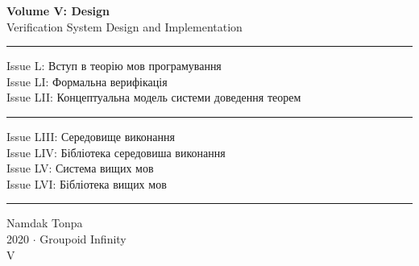 \documentclass{book}
\begin{document}
\begin{titlepage}
    \centering
    \vspace*{0.5in}
    \Huge
    \textbf{Volume V: Design} \\
    \LARGE
    Verification System Design and Implementation \\
    \vspace{1.5in}
    \small
    \flushleft
    \vspace{-2mm} \rule{\textwidth}{0.4pt}
    Issue L: Вступ в теорію мов програмування \\
    Issue LI: Формальна верифікація \\
    Issue LII: Концептуальна модель системи доведення теорем \\
    \vspace{-2mm} \rule{\textwidth}{0.4pt}
    Issue LIII: Середовище виконання \\
    Issue LIV: Бібліотека середовиша виконання \\
    Issue LV: Система вищих мов \\
    Issue LVI: Бібліотека вищих мов \\
    \vspace{-2mm} \rule{\textwidth}{0.4pt}
    \centering
    \vfill
    \large
    Namdak Tonpa \\
    \Large
    2020 $\cdot$ Groupoid Infinity \\
    V
\end{titlepage}

\tableofcontents
\newif\ifincludeTOC










\end{document}
